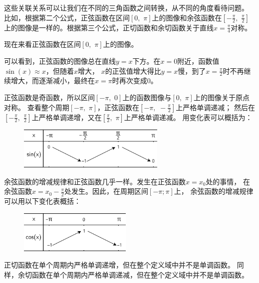 \documentclass[12pt,UTF8]{ctexbook}
\begin{document}
这些关联关系可以让我们在不同的三角函数之间转换，从不同的角度看待问题。
比如，根据第二个公式，正弦函数在区间$[0, \,\,\pi]$上的图像和余弦函数在$[-\frac{\pi}{2}, \,\,\frac{\pi}{2}]$
上的图像是一样的。根据第三个公式，正切函数和余切函数关于直线$x = \frac{\pi}{4}$对称。

现在来看正弦函数在区间$[0, \,\,\pi]$上的图像。

可以看到，正弦函数的图像总在直线$y = x$下方。在$x = 0$附近，函数值$\sin(x)\approx x$，但随着$x$增大，
$x$的正弦值增大得比$y=x$慢，到了$x=\frac{\pi}{2}$时不再继续增大，而逐渐减小，最终在$x=\pi$时再次变成$0$。

正弦函数是奇函数，所以区间$[-\pi, \,\,0]$上的函数图像与$[0, \,\,\pi]$上的图像关于原点对称。
查看整个周期$[-\pi, \,\,\pi]$，正弦函数在$[-\pi, \,\,-\frac{\pi}{2}]$上严格单调递减；
然后在$[-\frac{\pi}{2}, \,\,\frac{\pi}{2}]$上严格单调递增，又在$[\frac{\pi}{2}, \,\,\pi]$上严格单调递减。
用变化表可以概括为：

\begin{figure}[h] %
    \centering
    \includegraphics[width=0.63\textwidth]{tu/三角函数变化表1.png}
\end{figure}

余弦函数的增减规律和正弦函数几乎一样。发生在正弦函数$x=x_0$处的事情，
在余弦函数$x=x_0-\frac{\pi}{2}$处发生。因此，在周期区间$[-\pi; \pi]$上，
余弦函数的增减规律可以用以下变化表概括：

\begin{figure}[h] %
    \centering
    \includegraphics[width=0.48\textwidth]{tu/三角函数变化表2.png}
\end{figure}

正切函数在单个周期内严格单调递增，但在整个定义域中并不是单调函数。
同样，余切函数在单个周期内严格单调递减，但在整个定义域中并不是单调函数。
\end{document}
